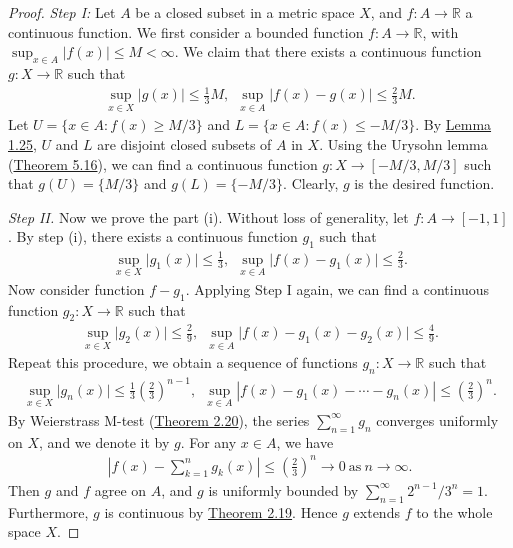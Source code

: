 \documentclass{article}
\numberwithin{equation}{section}
\theoremstyle{plain}
\theoremstyle{definition}
\begin{document}
\begin{proof}
\textit{Step I:} Let $A$ be a closed subset in a metric space $X$, and $f:A\to\mathbb{R}$ a continuous function. We first consider a bounded function $f:A\to\mathbb{R}$, with $\sup_{x\in A}\vert f(x)\vert\leq M < \infty$. We claim that there exists a continuous function $g:X\to\mathbb{R}$ such that
\begin{align*}
	\sup_{x\in X}\vert g(x)\vert \leq \frac{1}{3}M,\ \ \sup_{x\in A}\vert f(x)-g(x)\vert \leq \frac{2}{3}M.
\end{align*}
Let $U=\{x\in A:f(x)\geq M/3\}$ and $L=\{x\in A:f(x)\leq -M/3\}$. By \hyperref[lemma:1.25]{Lemma 1.25}, $U$ and $L$ are disjoint closed subsets of $A$ in $X$. Using the Urysohn lemma (\hyperref[thm:5.16]{Theorem 5.16}), we can find a continuous function $g:X\to[-M/3,M/3]$ such that $g(U)=\{M/3\}$ and $g(L)=\{-M/3\}$. Clearly, $g$ is the desired function.
\vspace{0.12cm}

\textit{Step II.} Now we prove the part (i). Without loss of generality, let $f:A\to [-1,1]$. By step (i), there exists a continuous function $g_1$ such that
\begin{align*}
	\sup_{x\in X}\vert g_1(x)\vert \leq \frac{1}{3},\ \ \sup_{x\in A}\vert f(x)-g_1(x)\vert \leq \frac{2}{3}.
\end{align*}
Now consider function $f-g_1$. Applying Step I again, we can find a continuous function $g_2:X\to\mathbb{R}$ such that
\begin{align*}
	\sup_{x\in X}\vert g_2(x)\vert \leq \frac{2}{9},\ \ \sup_{x\in A}\vert f(x) - g_1(x) - g_2(x)\vert \leq \frac{4}{9}.
\end{align*}
Repeat this procedure, we obtain a sequence of functions $g_n:X\to\mathbb{R}$ such that
\begin{align*}
	\sup_{x\in X}\vert g_n(x)\vert \leq \frac{1}{3}\left(\frac{2}{3}\right)^{n-1},\ \ \sup_{x\in A}\left\vert f(x) - g_1(x) - \cdots - g_n(x)\right\vert \leq \left(\frac{2}{3}\right)^{n}.
\end{align*}
By Weierstrass M-test (\hyperref[thm:2.20]{Theorem 2.20}), the series $\sum_{n=1}^\infty g_n$ converges uniformly on $X$, and we denote it by $g$. For any $x\in A$, we have
\begin{align*}
	\left\vert f(x) - \sum_{k=1}^n g_k(x)\right\vert \leq\left(\frac{2}{3}\right)^n \to 0\ \text{as}\ n\to\infty.
\end{align*}
Then $g$ and $f$ agree on $A$, and $g$ is uniformly bounded by $\sum_{n=1}^\infty 2^{n-1}/3^n = 1$. Furthermore, $g$ is continuous by \hyperref[thm:2.19]{Theorem 2.19}. Hence $g$ extends $f$ to the whole space $X$. 
\vspace{0.15cm}
	

\end{proof}
\end{document}
